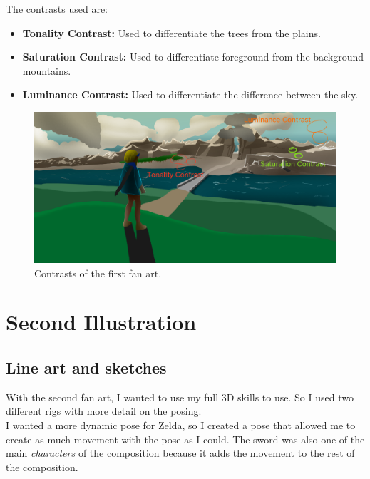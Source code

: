 \documentclass{cup-pan}
\begin{document}
            The contrasts used are:
            \begin{itemize}
                \item \textbf{Tonality Contrast:} Used to differentiate the trees from the plains.
                \item \textbf{Saturation Contrast:} Used to differentiate foreground from the background mountains. 
                \item \textbf{Luminance Contrast:} Used to differentiate the difference between the sky. 
            \end{itemize}

            \begin{figure}[H]
                \includegraphics[width=\textwidth]{Imagenes/Fanart1/Analysis/contraste.png}
                \caption{Contrasts of the first fan art.}
            \end{figure}

\newpage
\newpage
\section{Second Illustration}

    \subsection{Line art and sketches}

        With the second fan art, I wanted to use my full 3D skills to use. So I used two different rigs with more detail on the posing. \\
        
        I wanted a more dynamic pose for Zelda, so I created a pose that allowed me to create as much movement with the pose as I could. The sword was also one of the main \textit{characters} of the composition because it adds the movement to the rest of the composition.\\
\end{document}
